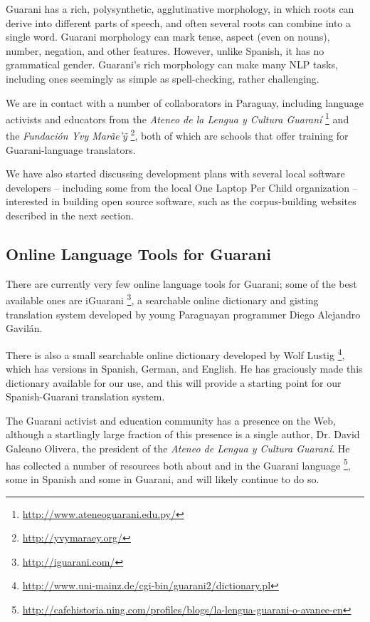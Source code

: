Guarani has a rich, polysynthetic, agglutinative morphology, in which roots can
derive into different parts of speech, and often several roots can combine into
a single word. Guarani morphology can mark tense, aspect (even on nouns),
number, negation, and other features. However, unlike Spanish, it has no
grammatical gender.  Guarani's rich morphology can make many NLP tasks,
including ones seemingly as simple as spell-checking, rather challenging.

We are in contact with a number of collaborators in Paraguay, including
language activists and educators from the \emph{Ateneo de la Lengua y Cultura
Guaraní} \footnote{\url{http://www.ateneoguarani.edu.py/}} and the
\emph{Fundación Yvy Marãe'{\~y}} \footnote{\url{http://yvymaraey.org/}},
both of which are schools that offer training for Guarani-language translators.

We have also started discussing development plans with several local software
developers -- including some from the local One Laptop Per Child organization
-- interested in building open source software, such as the corpus-building
websites described in the next section.

\subsection{Online Language Tools for Guarani}
There are currently very few online language tools for Guarani; some of the
best available ones are iGuarani \footnote{\url{http://iguarani.com/}}, a
searchable online dictionary and gisting translation system developed by young
Paraguayan programmer Diego Alejandro Gavilán.

There is also a small searchable online dictionary developed by Wolf Lustig
\footnote{\url{http://www.uni-mainz.de/cgi-bin/guarani2/dictionary.pl}},
which has versions in Spanish, German, and English. He has graciously made this
dictionary available for our use, and this will provide a starting point for
our Spanish-Guarani translation system.

The Guarani activist and education community has a presence on the Web,
although a startlingly large fraction of this presence is a single author,
Dr. David Galeano Olivera, the president of the \emph{Ateneo de Lengua y
Cultura Guaraní}. He has collected a number of resources both about and in the
Guarani language
\footnote{\url{http://cafehistoria.ning.com/profiles/blogs/la-lengua-guarani-o-avanee-en}},
some in Spanish and some in Guarani, and will likely continue to do so.
